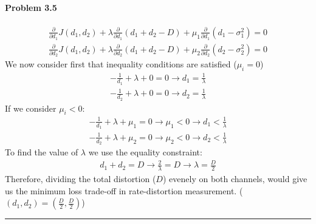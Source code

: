 \documentclass[12pt, letterpaper]{scrartcl}
\begin{document}
\paragraph*{Problem 3.5} \hfill\newline
\begin{align*}
    \frac{\partial}{\partial d_1}J(d_1,d_2)+\lambda\frac{\partial}{\partial d_1}(d_1+d_2-D) + \mu_1\frac{\partial}{\partial d_1}(d_1-\sigma_1^2)=0\\
    \frac{\partial}{\partial d_2}J(d_1,d_2)+\lambda\frac{\partial}{\partial d_2}(d_1+d_2-D) + \mu_2\frac{\partial}{\partial d_2}(d_2-\sigma_2^2)=0
\end{align*}
We now consider first that inequality conditions are satisfied ($\mu_i=0$)
\begin{align*}
    -\frac{1}{d_1}+\lambda+0=0 \longrightarrow d_1 = \frac{1}{\lambda}\\
    -\frac{1}{d_2}+\lambda+0=0 \longrightarrow  d_2 = \frac{1}{\lambda}
\end{align*}
If we consider $\mu_i<0$:
\begin{align*}
    -\frac{1}{d_1}+\lambda+\mu_1=0 \longrightarrow \mu_1<0\longrightarrow d_1 < \frac{1}{\lambda}\\
    -\frac{1}{d_2}+\lambda+\mu_2=0 \longrightarrow \mu_2<0\longrightarrow d_2 < \frac{1}{\lambda}
\end{align*}
To find the value of $\lambda$ we use the equality constraint:
\begin{align*}
    d_1+d_2=D \longrightarrow \frac{2}{\lambda}=D \longrightarrow \lambda=\frac{D}{2}
\end{align*}
Therefore, dividing the total distortion ($D$) evenely on both channels, would give us the minimum loss trade-off in rate-distortion measurement. ($(d_1,d_2)=(\frac{D}{2}, \frac{D}{2})$)\\
\hrule
\end{document}

